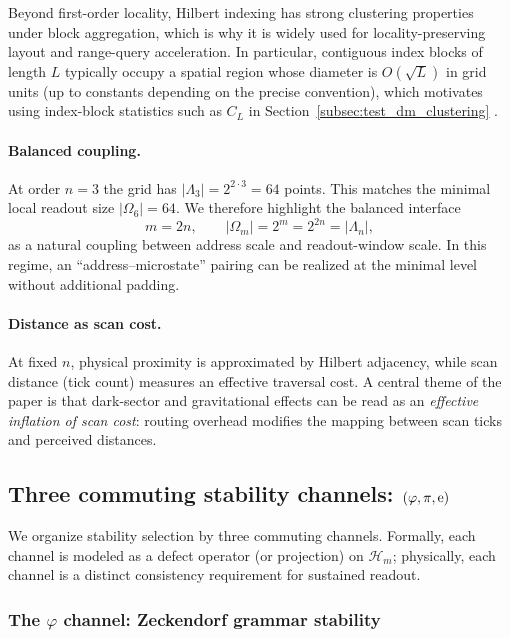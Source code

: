 \begin{remark}
Beyond first-order locality, Hilbert indexing has strong clustering properties under block aggregation, which is why it is widely used for locality-preserving layout and range-query acceleration.
In particular, contiguous index blocks of length $L$ typically occupy a spatial region whose diameter is $O(\sqrt{L})$ in grid units (up to constants depending on the precise convention), which motivates using index-block statistics such as $C_L$ in Section~\ref{subsec:test_dm_clustering} \cite{Sagan1994,MoonJagadishFaloutsosSaltz2001}.
\end{remark}

\paragraph{Balanced coupling.}
At order $n=3$ the grid has $|\Lambda_3|=2^{2\cdot 3}=64$ points.
This matches the minimal local readout size $|\Omega_6|=64$.
We therefore highlight the balanced interface
\[
m=2n,
\qquad
|\Omega_m|=2^m=2^{2n}=|\Lambda_n|,
\]
as a natural coupling between address scale and readout-window scale.
In this regime, an ``address--microstate'' pairing can be realized at the minimal level without additional padding.

\paragraph{Distance as scan cost.}
At fixed $n$, physical proximity is approximated by Hilbert adjacency, while scan distance (tick count) measures an effective traversal cost.
A central theme of the paper is that dark-sector and gravitational effects can be read as an \emph{effective inflation of scan cost}: routing overhead modifies the mapping between scan ticks and perceived distances.

\subsection{Three commuting stability channels: \texorpdfstring{$(\varphi,\pi,\mathrm{e})$}{(phi,pi,e)}}
\label{subsec:three_channels}

We organize stability selection by three commuting channels.
Formally, each channel is modeled as a defect operator (or projection) on $\mathcal{H}_m$; physically, each channel is a distinct consistency requirement for sustained readout.

\subsubsection{The \texorpdfstring{$\varphi$}{phi} channel: Zeckendorf grammar stability}
\label{subsubsec:phi_channel}

